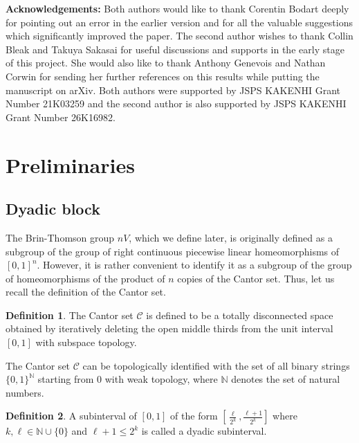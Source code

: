 \documentclass[12pt,reqno]{amsart}
\theoremstyle{plain}
\theoremstyle{definition}
\newtheorem{definition}{Definition}[section]
\theoremstyle{remark}
\numberwithin{equation}{section}
\begin{document}
\noindent 
{\bf Acknowledgements:} 
% 
Both authors would like to thank Corentin Bodart deeply for pointing out 
an error in the earlier version and for all the valuable suggestions which significantly improved the paper.
The second author wishes to thank Collin Bleak and Takuya Sakasai 
for useful discussions and supports in the early stage of this project. 
She would also like to thank Anthony Genevois and Nathan Corwin 
for sending her further references on this results while putting 
the manuscript  \cite{Sheng} on arXiv. 
%
Both authors were supported by JSPS KAKENHI Grant Number 21K03259 
and the second author is also supported by JSPS KAKENHI Grant Number 26K16982.


%
%
\medskip 
\section{Preliminaries}\label{Sec:Preliminaries}  


\subsection{Dyadic block} 

The Brin-Thomson group  $nV$,  which we define later, 
is originally defined as a subgroup of the group of right continuous piecewise linear 
homeomorphisms of  $[0, 1]^n$.  
However, 
it is rather convenient to identify it as a subgroup of the group of 
homeomorphisms of the product of  $n$  copies of the Cantor set.  
Thus,  
let us recall the definition of the Cantor set.   

\begin{definition} 
	The Cantor set  $\mathcal{C}$   is defined to be a totally disconnected
	space obtained by iteratively deleting 
	the open middle thirds from the unit interval  $[0, 1]$  with subspace topology.  
\end{definition} 

The Cantor set  $\mathcal{C}$   can be topologically identified with the set of all binary strings  
$\{ 0, 1\}^{\mathbb{N}}$  starting from  $0$  with weak topology, 
where  $\mathbb{N}$  denotes the set of natural numbers.

\begin{definition}\label{Def:Subinterval} 
	A subinterval of  $[0, 1]$  of  
	the form  $\left[ \frac{\ell}{2^k}, \frac{\ell+1}{2^k}\right]$  
	where  $k, \ell \in \mathbb{N} \cup \{ 0 \}$  and  $\ell + 1 \leq 2^k$  
	is called a dyadic subinterval.  
\end{definition} 
\end{document}
